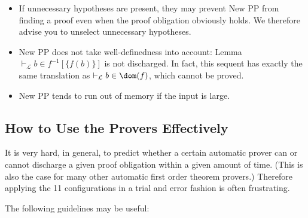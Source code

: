 \begin{description}
\begin{itemize}
		\item If unnecessary hypotheses are present, they may prevent New PP from finding a proof even when the proof obligation obviously holds. We therefore advise you to unselect unnecessary hypotheses.
		\item New PP does not take well-definedness into account:
	        Lemma $\vdash_{\mathcal L} b \in f^{-1} [\{f(b)\}]$ is not discharged. In fact, this sequent has exactly the same translation as $\vdash_{\mathcal L} b \in\dom(f)$, which cannot be proved. 
		\item New PP tends to run out of memory if the input is large. 
	\end{itemize}
\end{description}

\subsection{How to Use the Provers Effectively}
\label{use_provers_effectively}

It is very hard, in general, to predict whether a certain automatic prover can or cannot discharge a given proof obligation within a given amount of time. (This is also the case for many other automatic first order theorem provers.) Therefore applying the 11 configurations in a trial and error fashion is often frustrating.

The following guidelines may be useful:

